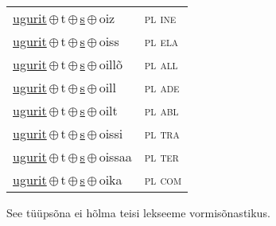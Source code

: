 \begin{minipage}{\textwidth}
\begin{sideways}
\begin{tabular}{l l}
\underline{ugurit}\,$\oplus$\,t\,$\oplus$\,\underline{s}\,$\oplus$\,oiz & \textsc{ pl ine } \\
\underline{ugurit}\,$\oplus$\,t\,$\oplus$\,\underline{s}\,$\oplus$\,oiss & \textsc{ pl ela } \\
\underline{ugurit}\,$\oplus$\,t\,$\oplus$\,\underline{s}\,$\oplus$\,oillõ & \textsc{ pl all } \\
\underline{ugurit}\,$\oplus$\,t\,$\oplus$\,\underline{s}\,$\oplus$\,oill & \textsc{ pl ade } \\
\underline{ugurit}\,$\oplus$\,t\,$\oplus$\,\underline{s}\,$\oplus$\,oilt & \textsc{ pl abl } \\
\underline{ugurit}\,$\oplus$\,t\,$\oplus$\,\underline{s}\,$\oplus$\,oissi & \textsc{ pl tra } \\
\underline{ugurit}\,$\oplus$\,t\,$\oplus$\,\underline{s}\,$\oplus$\,oissaa & \textsc{ pl ter } \\
\underline{ugurit}\,$\oplus$\,t\,$\oplus$\,\underline{s}\,$\oplus$\,oika & \textsc{ pl com } \\
\end{tabular}
\end{sideways}
\label{tab:tüüpsõnamall-ugurittsõ}

\end{minipage}

 
\vspace{1em}
\noindent See tüüpsõna ei hõlma teisi lekseeme vormi\-sõnastikus.
